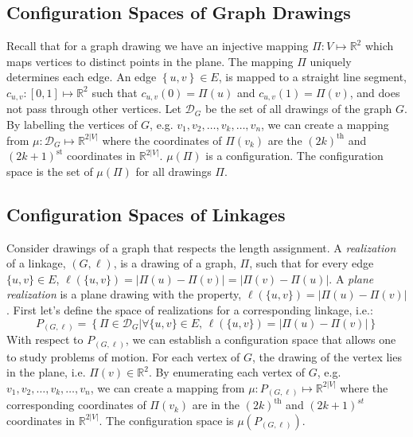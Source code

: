\documentclass[10pt]{CSUNthesis}
\theoremstyle{plain}%
\theoremstyle{definition}
\theoremstyle{remark}
\newcommand{\DD}{{\mathcal{D}}} %
\newcommand{\bbR}{{\mathbb{R}}}
\newcommand{\set}[2]{{\left\lbrace \left.  #1 \left\vert #2  \right.\right.\right\rbrace  }}
\newcommand{\lr}[1]{\left( #1 \right)}
\newcommand{\curlybraces}[1]{\left\lbrace #1 \right\rbrace}
\begin{document}
\subsection{Configuration Spaces of Graph Drawings}
Recall that for a graph drawing we have an injective mapping $\Pi : V \mapsto \bbR^{2}$ which maps vertices to distinct points in the plane.  %
The mapping $\Pi$ uniquely determines each edge.
An edge $\curlybraces{u,v} \in E$, is mapped to a straight line segment, $c_{u,v}:[0,1]\mapsto \bbR^2$ such that $c_{u,v}(0) = \Pi(u)$ and $c_{u,v}(1) = \Pi(v)$, and does not pass through other vertices.
Let $\DD_G$ be the set of all drawings of the graph $G$.  
By labelling the vertices of $G$, e.g. $v_1, v_2, \dots, v_k, \dots, v_{n}$, we can create a mapping from $\mu: \DD_G \mapsto \bbR^{2\vert V \vert}$ where the coordinates of $\Pi(v_k)$ are the $(2k)^\text{th}$ and $(2k+1)^\text{st}$ coordinates in $\bbR^{2\vert V \vert}$.  
$\mu(\Pi)$ is a configuration.
The configuration space is the set of $\mu(\Pi)$ for all drawings $\Pi$.  

\subsection{Configuration Spaces of Linkages}

Consider drawings of a graph that respects the length assignment.  
A \textit{realization} of a linkage, $(G,\ell)$, is a drawing of a graph, $\Pi$, such that for every edge $\{u,v\} \in E$, $\ell\left( \{u,v\} \right) = \left\vert \Pi(u) - \Pi(v) \right\vert = \left\vert \Pi(v) - \Pi(u) \right\vert$. 
A \textit{plane realization} is a plane drawing with the property, $\ell\left( \{u,v\} \right) = \left\vert \Pi(u) - \Pi(v) \right\vert$.
First let's define the space of realizations for a corresponding linkage, i.e.:
$$P_{(G,\ell)} = \set{\Pi\in \DD_G }{\forall \{u,v\} \in E\text{, }\ell\left( \{u,v\} \right) = \left\vert \Pi(u) - \Pi(v) \right\vert}$$
With respect to $P_{(G,\ell)}$, we can establish a configuration space that allows one to study problems of motion.  
For each vertex of $G$, the drawing of the vertex lies in the plane, i.e. $\Pi(v) \in \bbR^2$.  
By enumerating each vertex of $G$, e.g. $v_1, v_2, \dots, v_k, \dots, v_{n}$, we can create a mapping from $\mu: P_{(G,\ell)} \mapsto \bbR^{2\vert V \vert}$ where the corresponding coordinates of $\Pi(v_k)$ are in the $(2k)^\text{th}$ and $(2k+1)^{st}$ coordinates in $\bbR^{2\vert V \vert}$.  
The configuration space is $\mu\lr{P_{(G,\ell)}}$.  
\end{document}
